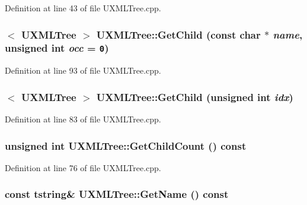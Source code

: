 Definition at line 43 of file UXMLTree.cpp.\hypertarget{class_u_x_m_l_tree_b8fcb5c72e4ed0707522d966a50974c3}{
\subsubsection[{GetChild}]{$<$ {\bf UXMLTree} $>$ UXMLTree::GetChild (const char $\ast$ {\em name}, \/  unsigned int {\em occ} = {\tt 0})}}
\label{class_u_x_m_l_tree_b8fcb5c72e4ed0707522d966a50974c3}




Definition at line 93 of file UXMLTree.cpp.\hypertarget{class_u_x_m_l_tree_3fb955c316489c5d83d319bcb80e872e}{
\subsubsection[{GetChild}]{$<$ {\bf UXMLTree} $>$ UXMLTree::GetChild (unsigned int {\em idx})}}
\label{class_u_x_m_l_tree_3fb955c316489c5d83d319bcb80e872e}




Definition at line 83 of file UXMLTree.cpp.\hypertarget{class_u_x_m_l_tree_a22f7f11cbd183d21f622b8c9ffec86f}{
\subsubsection[{GetChildCount}]{\setlength{\rightskip}{0pt plus 5cm}unsigned int UXMLTree::GetChildCount () const}}
\label{class_u_x_m_l_tree_a22f7f11cbd183d21f622b8c9ffec86f}




Definition at line 76 of file UXMLTree.cpp.\hypertarget{class_u_x_m_l_tree_06625e14b1b2ec2e8c35cfaa9bf5fa15}{
\subsubsection[{GetName}]{\setlength{\rightskip}{0pt plus 5cm}const {\bf tstring}\& UXMLTree::GetName () const}}
\label{class_u_x_m_l_tree_06625e14b1b2ec2e8c35cfaa9bf5fa15}




